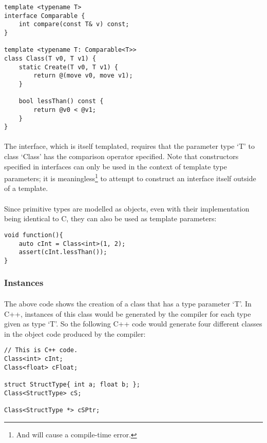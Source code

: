 \documentclass[12pt,twoside,notitlepage]{report}
\begin{document}
\begin{lstlisting}
template <typename T>
interface Comparable {
	int compare(const T& v) const;
}

template <typename T: Comparable<T>>
class Class(T v0, T v1) {
	static Create(T v0, T v1) {
		return @(move v0, move v1);
	}
	
	bool lessThan() const {
		return @v0 < @v1;
	}
}
\end{lstlisting}

\paragraph{}
The interface, which is itself templated, requires that the parameter type `T' to class `Class' has the comparison operator specified. Note that constructors specified in interfaces can only be used in the context of template type parameters; it is meaningless\footnote{And will cause a compile-time error.} to attempt to construct an interface itself outside of a template.

\paragraph{}
Since primitive types are modelled as objects, even with their implementation being identical to C, they can also be used as template parameters:

\begin{lstlisting}
void function(){
	auto cInt = Class<int>(1, 2);
	assert(cInt.lessThan());
}
\end{lstlisting}

\subsubsection{Instances}

\paragraph{}
The above code shows the creation of a class that has a type parameter `T'. In C++, instances of this class would be generated by the compiler for each type given as type `T'. So the following C++ code would generate four different classes in the object code produced by the compiler:

\begin{lstlisting}
// This is C++ code.
Class<int> cInt;
Class<float> cFloat;

struct StructType{ int a; float b; };
Class<StructType> cS;

Class<StructType *> cSPtr;
\end{lstlisting}
\end{document}
